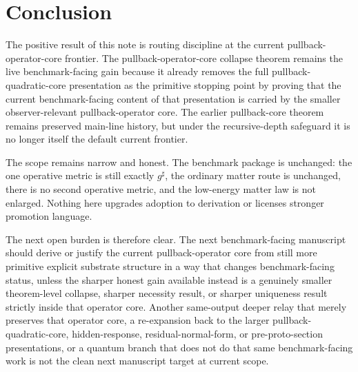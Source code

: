 \documentclass[11pt]{article}
\newcommand{\CompletedMetric}{g^{\sharp}}
\begin{document}
\section{Conclusion}

The positive result of this note is routing discipline at the current pullback-operator-core frontier. The pullback-operator-core collapse theorem remains the live benchmark-facing gain because it already removes the full pullback-quadratic-core presentation as the primitive stopping point by proving that the current benchmark-facing content of that presentation is carried by the smaller observer-relevant pullback-operator core. The earlier pullback-core theorem remains preserved main-line history, but under the recursive-depth safeguard it is no longer itself the default current frontier.

The scope remains narrow and honest. The benchmark package is unchanged: the one operative metric is still exactly \(\CompletedMetric\), the ordinary matter route is unchanged, there is no second operative metric, and the low-energy matter law is not enlarged. Nothing here upgrades adoption to derivation or licenses stronger promotion language.

The next open burden is therefore clear. The next benchmark-facing manuscript should derive or justify the current pullback-operator core from still more primitive explicit substrate structure in a way that changes benchmark-facing status, unless the sharper honest gain available instead is a genuinely smaller theorem-level collapse, sharper necessity result, or sharper uniqueness result strictly inside that operator core. Another same-output deeper relay that merely preserves that operator core, a re-expansion back to the larger pullback-quadratic-core, hidden-response, residual-normal-form, or pre-proto-section presentations, or a quantum branch that does not do that same benchmark-facing work is not the clean next manuscript target at current scope.
\end{document}
